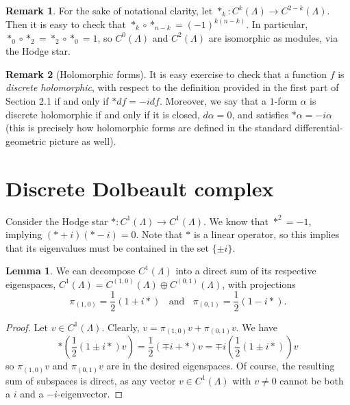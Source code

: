 \documentclass[aps,pra,showpacs,notitlepage,onecolumn,superscriptaddress,nofootinbib]{revtex4-1}
\theoremstyle{definition}
\newtheorem{lemma}{Lemma}[section]
\newtheorem{remark}{Remark}[section]
\begin{document}
\begin{remark}
  For the sake of notational clarity, let $*_{k} : C^{k}(\Lambda) \rightarrow C^{2 - k}(\Lambda)$. Then it is easy to check that $*_{k} \circ *_{n - k} = (-1)^{k (n - k)}$. In particular,
  $*_0 \circ *_{2} = *_{2} \circ *_0 = 1$, so $C^{0}(\Lambda)$ and $C^{2}(\Lambda)$ are isomorphic as modules, via the Hodge star.
\end{remark}

\begin{remark}[Holomorphic forms]
  \label{rem:b}
  It is easy exercise to check that a function $f$ is \emph{discrete holomorphic}, with respect to the definition provided in the first part of Section 2.1 if and only if $* df = -i df$.
  Moreover, we say that a $1$-form $\alpha$ is discrete holomorphic if and only if it is closed, $d\alpha = 0$, and satisfies $* \alpha = -i \alpha$ (this is precisely how holomorphic forms
  are defined in the standard differential-geometric picture as well).
  \end{remark}

\section{Discrete Dolbeault complex}

\noindent Consider the Hodge star $* : C^{1}(\Lambda) \rightarrow C^{1}(\Lambda)$. We know that $*^2 = -1$, implying $(* + i) (* - i) = 0$. Note that $*$ is a linear operator,
so this implies that its eigenvalues must be contained in the set $\{ \pm i \}$.

\begin{lemma}
We can decompose $C^{1}(\Lambda)$ into a direct sum of its respective eigenspaces, $C^{1}(\Lambda) = C^{(1, 0)}(\Lambda) \oplus C^{(0, 1)}(\Lambda)$, with projections
\begin{equation}
  \pi_{(1, 0)} = \frac{1}{2} ( 1 + i *) \ \ \ \ \text{and} \ \ \ \ \pi_{(0, 1)} = \frac{1}{2} (1 - i *).
\end{equation}
\end{lemma}
\begin{proof}
  Let $v \in C^{1}(\Lambda)$. Clearly, $v = \pi_{(1, 0)} v + \pi_{(0, 1)} v$. We have
  \begin{equation}
    * \left( \frac{1}{2} (1 \pm i *) v \right) = \frac{1}{2} (\mp i + *) v = \mp i \left( \frac{1}{2} (1 \pm i *) \right) v
  \end{equation}
  so $\pi_{(1, 0)} v$ and $\pi_{(0, 1)} v$ are in the desired eigenspaces. Of course, the resulting sum of subspaces is direct, as any vector $v \in C^{1}(\Lambda)$ with $v \neq 0$ cannot be both a $i$ and a $-i$-eigenvector.
  \end{proof}
\end{document}
